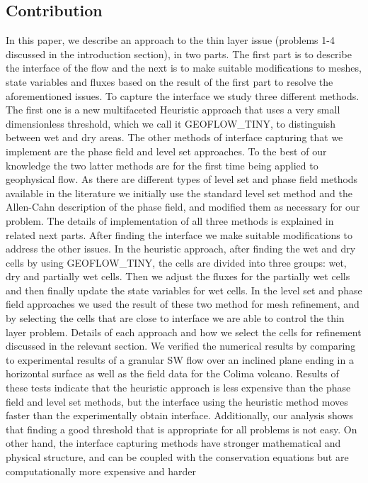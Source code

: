 \documentclass[letterpaper,10pt]{article}
\begin{document}
\subsection{Contribution}
In this paper, we describe an approach to the thin layer issue (problems 1-4 discussed in the introduction section), in two parts. 
The first part is to describe the interface of the 
flow and the next is to make suitable modifications to meshes, state variables and fluxes based on the result of the first part to resolve the aforementioned issues.
To capture the interface we study three different methods. The first one is a new multifaceted Heuristic approach that uses a very small dimensionless threshold, which we call it GEOFLOW\_TINY, to 
distinguish between wet and dry areas. The other methods of interface capturing that we implement are the phase field and level set approaches.
To the best of our knowledge the two latter methods are for the first time being applied to geophysical flow. 
As there are different types of level set and phase field methods available in the 
literature we initially use the standard level set method and the Allen-Cahn description of the phase field, and modified them as necessary for our problem. 
The details of implementation of all three methods is explained in related next parts.
After finding the interface we make suitable modifications to address the other issues. In the heuristic approach, after finding the wet and dry cells by using GEOFLOW\_TINY, the cells are divided 
into three groups: wet, dry and partially wet cells. Then we adjust the fluxes for the partially wet cells and then finally update the state variables for wet cells.
In the level set and phase field approaches we used the result of these two method for mesh refinement, and by selecting the cells that are close to interface we are able to control the thin layer problem. 
Details of each approach and how we select the cells for refinement discussed in the relevant section.
We verified the numerical results by comparing to experimental results of a granular SW flow over an inclined plane ending in a horizontal surface as well as the field data for the Colima volcano.
Results of these tests indicate that
the heuristic approach is less expensive than the phase field and level set methods, but the interface using the heuristic method moves faster than the 
experimentally obtain interface. Additionally, our analysis shows that finding a good threshold that is appropriate for all problems is not easy. 
On other hand, the interface capturing methods have stronger mathematical and physical structure, and can be coupled with the conservation equations but are computationally more expensive and harder 
\end{document}
